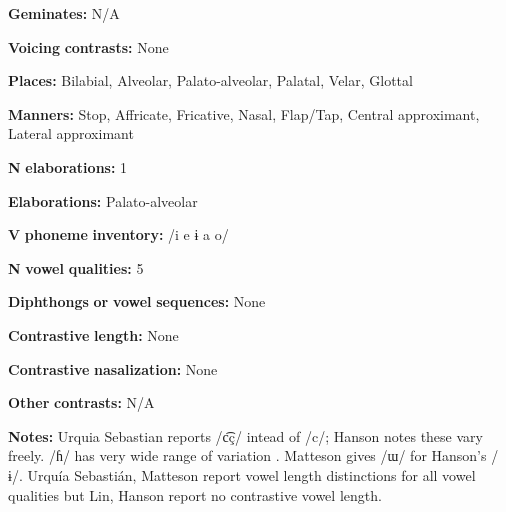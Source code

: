 \documentclass[output=paper]{langsci/langscibook}
\begin{document}
\begin{styleBody}
\textbf{Geminates:} N/A
\end{styleBody}

\begin{styleBody}
\textbf{Voicing} \textbf{contrasts:} None
\end{styleBody}

\begin{styleBody}
\textbf{Places:} Bilabial, Alveolar, Palato-alveolar, Palatal, Velar, Glottal
\end{styleBody}

\begin{styleBody}
\textbf{Manners:} Stop, Affricate, Fricative, Nasal, Flap/Tap, Central approximant, Lateral approximant
\end{styleBody}

\begin{styleBody}
\textbf{N} \textbf{elaborations:} 1
\end{styleBody}

\begin{styleBody}
\textbf{Elaborations:} Palato-alveolar
\end{styleBody}

\begin{styleBody}
\textbf{V} \textbf{phoneme} \textbf{inventory:} /i e ɨ a o/
\end{styleBody}

\begin{styleBody}
\textbf{N} \textbf{vowel} \textbf{qualities:} 5
\end{styleBody}

\begin{styleBody}
\textbf{Diphthongs} \textbf{or} \textbf{vowel} \textbf{sequences:} None
\end{styleBody}

\begin{styleBody}
\textbf{Contrastive} \textbf{length:} None
\end{styleBody}

\begin{styleBody}
\textbf{Contrastive} \textbf{nasalization:} None
\end{styleBody}

\begin{styleBody}
\textbf{Other} \textbf{contrasts:} N/A
\end{styleBody}

\begin{styleBody}
\textbf{Notes:} Urquia Sebastian reports /c͡ç/ intead of /c/; Hanson notes these vary freely. /ɦ/ has very wide range of variation \citep[20-23]{Hanson2010}. Matteson gives /ɯ/ for Hanson’s /ɨ/. Urquía Sebastián, Matteson report vowel length distinctions for all vowel qualities but Lin, Hanson report no contrastive vowel length.
\end{styleBody}
\end{document}
